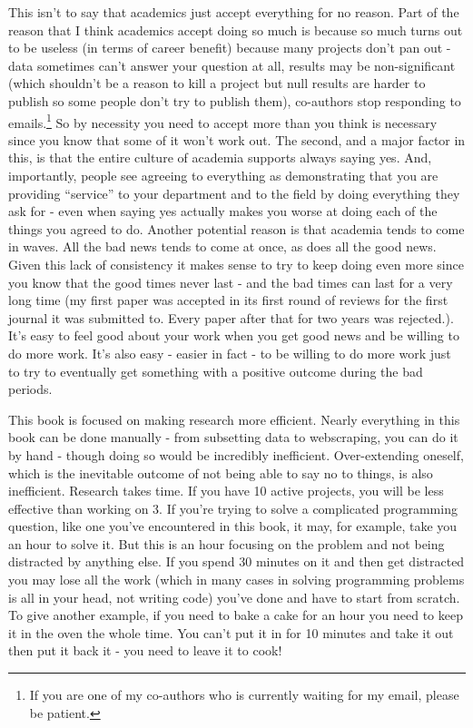 \documentclass[
  12pt,
]{book}
\begin{document}
This isn't to say that academics just accept everything for no reason. Part of the reason that I think academics accept doing so much is because so much turns out to be useless (in terms of career benefit) because many projects don't pan out - data sometimes can't answer your question at all, results may be non-significant (which shouldn't be a reason to kill a project but null results are harder to publish so some people don't try to publish them), co-authors stop responding to emails.\footnote{If you are one of my co-authors who is currently waiting for my email, please be patient.} So by necessity you need to accept more than you think is necessary since you know that some of it won't work out. The second, and a major factor in this, is that the entire culture of academia supports always saying yes. And, importantly, people see agreeing to everything as demonstrating that you are providing ``service'' to your department and to the field by doing everything they ask for - even when saying yes actually makes you worse at doing each of the things you agreed to do. Another potential reason is that academia tends to come in waves. All the bad news tends to come at once, as does all the good news. Given this lack of consistency it makes sense to try to keep doing even more since you know that the good times never last - and the bad times can last for a very long time (my first paper was accepted in its first round of reviews for the first journal it was submitted to. Every paper after that for two years was rejected.). It's easy to feel good about your work when you get good news and be willing to do more work. It's also easy - easier in fact - to be willing to do more work just to try to eventually get something with a positive outcome during the bad periods.

This book is focused on making research more efficient. Nearly everything in this book can be done manually - from subsetting data to webscraping, you can do it by hand - though doing so would be incredibly inefficient. Over-extending oneself, which is the inevitable outcome of not being able to say no to things, is also inefficient. Research takes time. If you have 10 active projects, you will be less effective than working on 3. If you're trying to solve a complicated programming question, like one you've encountered in this book, it may, for example, take you an hour to solve it. But this is an hour focusing on the problem and not being distracted by anything else. If you spend 30 minutes on it and then get distracted you may lose all the work (which in many cases in solving programming problems is all in your head, not writing code) you've done and have to start from scratch. To give another example, if you need to bake a cake for an hour you need to keep it in the oven the whole time. You can't put it in for 10 minutes and take it out then put it back it - you need to leave it to cook!
\end{document}
